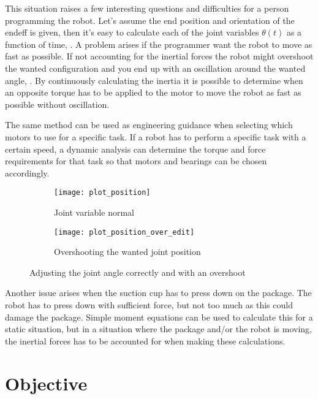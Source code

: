 This situation raises a few interesting questions and difficulties for a person programming the robot. Let's assume the end position and orientation of the \gls{endeff} is given, then it's easy to calculate each of the joint variables $\theta (t)$ as a function of time, . A problem arises if the programmer want the robot to move as fast as possible. If not accounting for the inertial forces the robot might overshoot the wanted configuration and you end up with an oscillation around the wanted angle, . By continuously calculating the inertia it is possible to determine when an opposite torque has to be applied to the motor to move the robot as fast as possible without oscillation.

The same method can be used as engineering guidance when selecting which motors to use for a specific task. If a robot has to perform a specific task with a certain speed, a dynamic analysis can determine the torque and force requirements for that task so that motors and bearings can be chosen accordingly.

\begin{figure}[ht!]
\begin{subfigure}{0.5\textwidth}
    \centering
    \texttt{[image: plot\_position]}
    \caption{Joint variable normal}
    \label{plot_position}
\end{subfigure}
\hfill
\begin{subfigure}{0.5\textwidth}
    \centering
    \texttt{[image: plot\_position\_over\_edit]}
    \caption{Overshooting the wanted joint position}
    \label{plot_position_over}
\end{subfigure}
\caption{Adjusting the joint angle correctly and with an overshoot}
\label{joint_position}
\end{figure}

Another issue arises when the suction cup has to press down on the package. The robot has to press down with sufficient force, but not too much as this could damage the package. Simple moment equations can be used to calculate this for a static situation, but in a situation where the package and/or the robot is moving, the inertial forces has to be accounted for when making these calculations.


\section{Objective}


